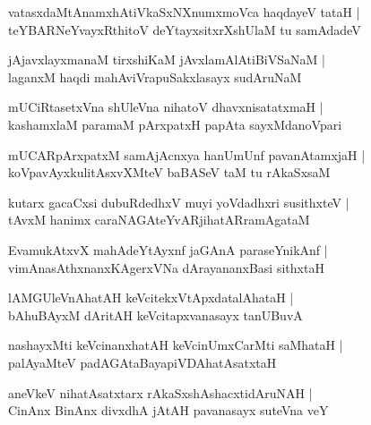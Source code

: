 \documentclass[twoside,12pt,openright]{book}
\newcounter{shloka}[chapter]
\begin{document}
\begin{shloka}%
vatasxdaMtAnamxhAtiVkaSxNXnumxmoVca haqdayeV tataH |\\
teYBARNeYvayxRthitoV deYtayxsitxrXshUlaM tu samAdadeV 
\end{shloka}

\begin{shloka}%
jAjavxlayxmanaM tirxshiKaM jAvxlamAlAtiBiVSaNaM |\\
laganxM haqdi mahAviVrapuSakxlasayx sudAruNaM 
\end{shloka}

\begin{shloka}%
mUCiRtasetxVna shUleVna nihatoV dhavxnisatatxmaH |\\
kashamxlaM paramaM pArxpatxH papAta sayxMdanoVpari
\end{shloka}

\begin{shloka}%
mUCARpArxpatxM samAjAcnxya hanUmUnf pavanAtamxjaH |\\
koVpavAyxkulitAsxvXMteV baBASeV taM tu rAkaSxsaM 
\end{shloka}

\begin{shloka}%
kutarx gacaCxsi dubuRdedhxV muyi yoVdadhxri susithxteV |\\
tAvxM hanimx caraNAGAteYvARjihatARramAgataM 
\end{shloka}

\begin{shloka}%
EvamukAtxvX mahAdeYtAyxnf jaGAnA paraseYnikAnf |\\
vimAnasAthxnanxKAgerxVNa dArayananxBasi sithxtaH
\end{shloka}

\begin{shloka}%
lAMGUleVnAhatAH keVcitekxVtApxdatalAhataH |\\
bAhuBAyxM dAritAH keVcitapxvanasayx tanUBuvA 
\end{shloka}

\begin{shloka}%
nashayxMti keVcinanxhatAH keVcinUmxCarMti saMhataH |\\
palAyaMteV padAGAtaBayapiVDAhatAsatxtaH 
\end{shloka}

\begin{shloka}%
aneVkeV nihatAsatxtarx rAkaSxshAshacxtidAruNAH |\\
CinAnx BinAnx divxdhA jAtAH pavanasayx suteVna veY 
\end{shloka}
\end{document}
